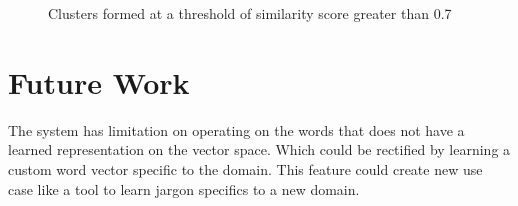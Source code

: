\documentclass[11pt,a4paper]{article}
\begin{document}
\begin{figure}[p!]
{  }
  \hspace{0mm}
  \hspace{0mm}
  \caption{Clusters formed at a threshold of similarity score greater than 0.7}
  \label{fig:clusters}
\end{figure}

\section{Future Work}
The system has limitation on operating on the words that does not have a learned representation on the vector space. Which could be rectified by learning a custom word vector specific to the domain. This feature could create new use case like a tool to learn jargon specifics to a new domain.
\end{document}
